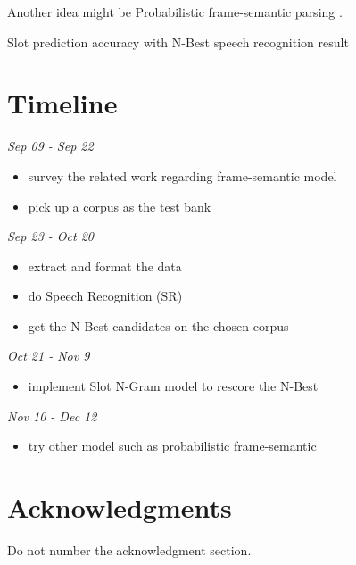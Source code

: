 \documentclass[11pt,letterpaper]{article}
\begin{document}
Another idea might be Probabilistic frame-semantic parsing \cite{Das:2010}.

\begin{table*}[!htb] 
\centering 
 
\caption{Slot prediction accuracy with N-Best speech recognition result} 
\label{table:slot_nbest_nodummy} 
\end{table*} 

\section{Timeline}

\noindent \emph{Sep 09 - Sep 22}
\begin{itemize}
  \item survey the related work regarding frame-semantic model
  \item pick up a corpus as the test bank
\end{itemize}

\noindent \emph{Sep 23 -  Oct 20}
\begin{itemize}
  \item extract and format the data
  \item do Speech Recognition (SR)
  \item get the N-Best candidates on the chosen corpus
\end{itemize}

\noindent \emph{Oct 21 - Nov 9}
\begin{itemize}
  \item implement Slot N-Gram model to rescore the N-Best
\end{itemize}

\noindent \emph{Nov 10 - Dec 12}
\begin{itemize}
  \item try other model such as probabilistic frame-semantic
\end{itemize}

\section*{Acknowledgments}

Do not number the acknowledgment section.
\end{document}
